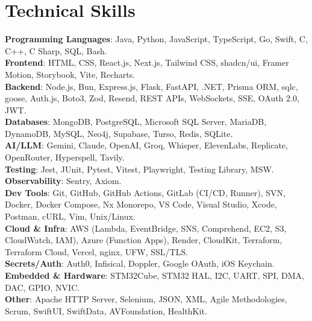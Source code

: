 \documentclass[letterpaper,11pt]{article}
\begin{document}
\section{Technical Skills}
\begin{itemize}[leftmargin=0.15in, label={}]
\small{\item{
\textbf{Programming Languages}{: Java, Python, JavaScript, TypeScript, Go, Swift, C, C++, C Sharp, SQL, Bash.} \\
\textbf{Frontend}{: HTML, CSS, React.js, Next.js, Tailwind CSS, shadcn/ui, Framer Motion, Storybook, Vite, Recharts.} \\
\textbf{Backend}{: Node.js, Bun, Express.js, Flask, FastAPI, .NET, Prisma ORM, sqlc, goose, Auth.js, Boto3, Zod, Resend, REST APIs, WebSockets, SSE, OAuth 2.0, JWT.} \\
\textbf{Databases}{: MongoDB, PostgreSQL, Microsoft SQL Server, MariaDB, DynamoDB, MySQL, Neo4j, Supabase, Turso, Redis, SQLite.} \\
\textbf{AI/LLM}{: Gemini, Claude, OpenAI, Groq, Whisper, ElevenLabs, Replicate, OpenRouter, Hyperspell, Tavily.} \\
\textbf{Testing}{: Jest, JUnit, Pytest, Vitest, Playwright, Testing Library, MSW.} \\
\textbf{Observability}{: Sentry, Axiom.} \\
\textbf{Dev Tools}{: Git, GitHub, GitHub Actions, GitLab (CI/CD, Runner), SVN, Docker, Docker Compose, Nx Monorepo, VS Code, Visual Studio, Xcode, Postman, cURL, Vim, Unix/Linux.} \\
\textbf{Cloud \& Infra}{: AWS (Lambda, EventBridge, SNS, Comprehend, EC2, S3, CloudWatch, IAM), Azure (Function Apps), Render, CloudKit, Terraform, Terraform Cloud, Vercel, nginx, UFW, SSL/TLS.} \\
\textbf{Secrets/Auth}{: Auth0, Infisical, Doppler, Google OAuth, iOS Keychain.} \\
\textbf{Embedded \& Hardware}{: STM32Cube, STM32 HAL, I2C, UART, SPI, DMA, DAC, GPIO, NVIC.} \\
\textbf{Other}{: Apache HTTP Server, Selenium, JSON, XML, Agile Methodologies, Scrum, SwiftUI, SwiftData, AVFoundation, HealthKit.}}}
\end{itemize}

\end{document}
